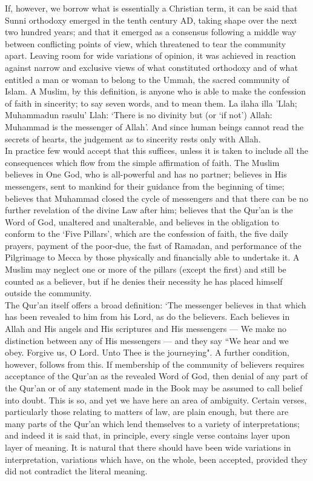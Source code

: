 \documentclass[10pt, twoside,openright]{book}
\begin{document}
If, however, we borrow what is essentially a Christian term, it can be said that Sunni orthodoxy emerged in the tenth century AD, taking shape over the next two hundred years; and that it emerged as a consensus following a middle way between conflicting points of view, which threatened to tear the community apart. Leaving room for wide variations of opinion, it was achieved in reaction against narrow and exclusive views of what constituted orthodoxy and of what entitled a man or woman to belong to the Ummah, the sacred community of Islam. A Muslim, by this definition, is anyone who is able to make the confession of faith in sincerity; to say seven words, and to mean them. La ilaha illa 'Llah; Muhammadun rasulu' Llah: `There is no divinity but (or `if not') Allah: Muhammad is the messenger of Allah'. And since human beings cannot read the secrets of hearts, the judgement as to sincerity rests only with Allah. \\

In practice few would accept that this suffices, unless it is taken to include all the consequences which flow from the simple affirmation of faith. The Muslim believes in One God, who is all\hyp{}powerful and has no partner; believes in His messengers, sent to mankind for their guidance from the beginning of time; believes that Muhammad closed the cycle of messengers and that there can be no further revelation of the divine Law after him; believes that the Qur'an is the Word of God, unaltered and unalterable, and believes in the obligation to conform to the `Five Pillars', which are the confession of faith, the five daily prayers, payment of the poor\hyp{}due, the fast of Ramadan, and performance of the Pilgrimage to Mecca by those physically and financially able to undertake it. A Muslim may neglect one or more of the pillars (except the first) and still be counted as a believer, but if he denies their necessity he has placed himself outside the community. \\

The Qur'an itself offers a broad definition: `The messenger believes in that which has been revealed to him from his Lord, as do the believers. Each believes in Allah and His angels and His scriptures and His messengers --- We make no distinction between any of His messengers --- and they say ``We hear and we obey. Forgive us, O Lord. Unto Thee is the journeying". A further condition, however, follows from this. If membership of the community of believers requires acceptance of the Qur'an as the revealed Word of God, then denial of any part of the Qur'an or of any statement made in the Book may be assumed to call belief into doubt. This is so, and yet we have here an area of ambiguity. Certain verses, particularly those relating to matters of law, are plain enough, but there are many parts of the Qur'an which lend themselves to a variety of interpretations; and indeed it is said that, in principle, every single verse contains layer upon layer of meaning. It is natural that there should have been wide variations in interpretation, variations which have, on the whole, been accepted, provided they did not contradict the literal meaning. \\
\end{document}

